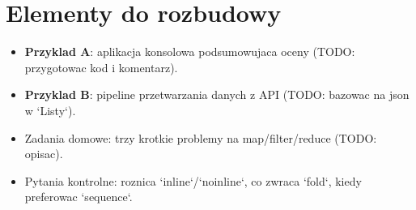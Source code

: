 \section{Elementy do rozbudowy}
\begin{itemize}
  \item \textbf{Przyklad A}: aplikacja konsolowa podsumowujaca oceny (TODO: przygotowac kod i komentarz).
  \item \textbf{Przyklad B}: pipeline przetwarzania danych z API (TODO: bazowac na json w `Listy`).
  \item Zadania domowe: trzy krotkie problemy na map/filter/reduce (TODO: opisac).
  \item Pytania kontrolne: roznica `inline`/`noinline`, co zwraca `fold`, kiedy preferowac `sequence`.
\end{itemize}


